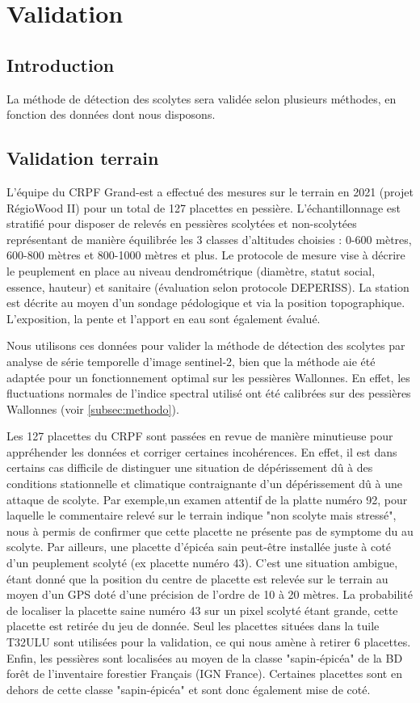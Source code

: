 \documentclass[a4paper, 12pt]{article} %
\begin{document}
\section{Validation}

\subsection{Introduction}

La méthode de détection des scolytes sera validée selon plusieurs méthodes, en fonction des données dont nous disposons.

\subsection{Validation terrain}

L'équipe du CRPF Grand-est a effectué des mesures sur le terrain en 2021 (projet RégioWood II) pour un total de 127 placettes en pessière. L'échantillonnage est stratifié pour disposer de relevés en pessières scolytées et non-scolytées représentant de manière équilibrée les 3 classes d'altitudes choisies : 0-600 mètres, 600-800 mètres et 800-1000 mètres et plus. Le protocole de mesure vise à décrire le peuplement en place au niveau dendrométrique (diamètre, statut social, essence, hauteur) et sanitaire (évaluation selon protocole DEPERISS). La station est décrite au moyen d'un sondage pédologique et via la position topographique. L'exposition, la pente et l'apport en eau sont également évalué.

Nous utilisons ces données pour valider la méthode de détection des scolytes par analyse de série temporelle d'image sentinel-2, bien que la méthode aie été adaptée pour un fonctionnement optimal sur les pessières Wallonnes. En effet, les fluctuations normales de l'indice spectral utilisé ont été calibrées sur des pessières Wallonnes (voir \ref{subsec:methodo}).

Les 127 placettes du CRPF sont passées en revue de manière minutieuse pour appréhender les données et corriger certaines incohérences. En effet, il est dans certains cas difficile de distinguer une situation de dépérissement dû à des conditions stationnelle et climatique contraignante d'un dépérissement dû à une attaque de scolyte. Par exemple,un examen attentif de la platte numéro 92, pour laquelle le commentaire relevé sur le terrain indique "non scolyte mais stressé", nous à permis de confirmer que cette placette ne présente pas de symptome du au scolyte. Par ailleurs, une placette d'épicéa sain peut-être installée juste à coté d'un peuplement scolyté (ex placette numéro 43). C'est une situation ambigue, étant donné que la position du centre de placette est relevée sur le terrain au moyen d'un GPS doté d'une précision de l'ordre de 10 à 20 mètres. La probabilité de localiser la placette saine numéro 43 sur un pixel scolyté étant grande, cette placette est retirée du jeu de donnée. Seul les placettes situées dans la tuile T32ULU sont utilisées pour la validation, ce qui nous amène à retirer 6 placettes. Enfin, les pessières sont localisées au moyen de la classe "sapin-épicéa" de la BD forêt de l'inventaire forestier Français (IGN France). Certaines placettes sont en dehors de cette classe "sapin-épicéa" et sont donc également mise de coté.
\end{document}
